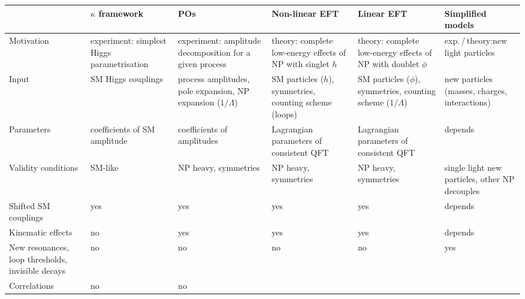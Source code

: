 \begin{table}
  \renewcommand{\arraystretch}{1.8}
  \footnotesize
  \begin{tabularx}{\textwidth}{LLLLLL} 
    \toprule 
    & $\kappa$ framework & POs & Non-linear EFT & Linear EFT & Simplified models \\
    \midrule
    Motivation & 
    experiment: \newline simplest Higgs parametrisation &
    experiment: \newline amplitude decomposition for a given process &
    theory: \newline complete low-energy effects of NP with singlet $h$& 
    theory: \newline complete low-energy effects of NP with doublet $\phi$ &
    exp.\,/\,theory:\newline new light particles \\
    Input & 
    SM Higgs couplings &
    process amplitudes, \newline pole expansion,  \newline NP expansion ($1/\Lambda $)&
    SM particles ($h$), \newline symmetries, \newline counting scheme (loops) & 
    SM particles ($\phi$), \newline symmetries, \newline counting scheme ($1/\Lambda $) & 
    new particles (masses, charges, interactions) \\
    Parameters & 
    coefficients of SM amplitude &
    coefficients of amplitudes &
    Lagrangian parameters of consistent QFT & 
    Lagrangian parameters of consistent QFT &
    depends \\
    Validity conditions & 
    SM-like &
    NP heavy, symmetries &
    NP heavy, symmetries & 
    NP heavy, symmetries &
    single light new particles, other NP decouples \\
    \midrule 
    Shifted SM couplings & 
    yes &
    yes &
    yes & 
    yes &
    depends \\
    Kinematic effects & 
    no &
    yes &
    yes & 
    yes &
    depends \\
    New resonances, \newline loop thresholds, \newline invisible decays & 
    no &
    no &
    no & 
    no &
    yes \\
    Correlations & 
    no &
    no &

\end{tabularx}
\end{table}
